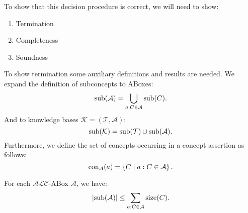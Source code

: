 
To show that this decision procedure is correct, we will need to show:
\begin{enumerate}
	\item Termination
	\item Completeness
	\item Soundness
\end{enumerate}

To show termination some auxiliary definitions and results are needed.
We expand the definition of subconcepts to ABoxes:
\[
	\operatorname{\text{sub}}(\mathcal{A}) = \bigcup_{a:C \in \mathcal{A}} \operatorname{\text{sub}}(C)
.\]
And to knowledge bases $\mathcal{K} = (\mathcal{T}, \mathcal{A})$:
\[
	\operatorname{\text{sub}}(\mathcal{K}) = \operatorname{\text{sub}}(\mathcal{T}) \cup \operatorname{\text{sub}}(\mathcal{A})
.\]
Furthermore, we define the set of concepts occurring in a concept assertion as follows:
\[
	\operatorname{\text{con}}_{\mathcal{A}}(a) = \left\{ C \mid a : C \in \mathcal{A} \right\}
.\]

\begin{lemma}\label{lem:cardinality bound abox subconcepts}
	For each $\mathcal{ALC}$-ABox $\mathcal{A}$, we have:
	\[
		\lvert \operatorname{\text{sub}}(\mathcal{A}) \rvert \leq \sum_{a:C \in \mathcal{A}} \operatorname{\text{size}}(C) 
	.\]
\end{lemma}

